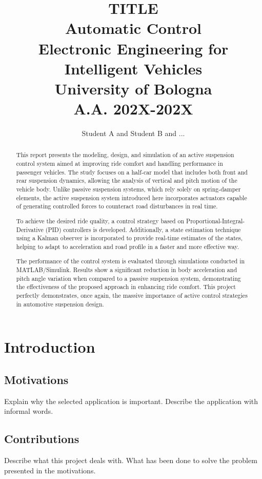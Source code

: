 \documentclass[]{report}
\title{{\huge  TITLE} \\
{\small Automatic Control\\
Electronic Engineering for Intelligent Vehicles\\
University of Bologna\\
A.A. 202X-202X}}
\author{Student A and Student B and ...}
\begin{document}
\maketitle

\begin{abstract}
This report presents the modeling, design, and simulation of an active suspension control system aimed at improving ride comfort and handling performance in passenger vehicles. The study focuses on a half-car model that includes both front and rear suspension dynamics, allowing the analysis of vertical and pitch motion of the vehicle body. Unlike passive suspension systems, which rely solely on spring-damper elements, the active suspension system introduced here incorporates actuators capable of generating controlled forces to counteract road disturbances in real time.

To achieve the desired ride quality, a control strategy based on Proportional-Integral-Derivative (PID) controllers is developed.  Additionally, a state estimation technique using a Kalman observer is incorporated to provide real-time estimates of the states, helping to adapt to acceleration and road profile in a faster and more effective way.

The performance of the control system is evaluated through simulations conducted in MATLAB/Simulink. Results show a significant reduction in body acceleration and pitch angle variation when compared to a passive suspension system, demonstrating the effectiveness of the proposed approach in enhancing ride comfort. This project perfectly demonstrates, once again, the massive importance of active control strategies in automotive suspension design.
\end{abstract}

\chapter{Introduction}
\section{Motivations}
Explain why the selected application is important. Describe the application with informal words.

\section{Contributions}
Describe what this project deals with. What has been done to solve the problem presented in the motivations.
\end{document}
